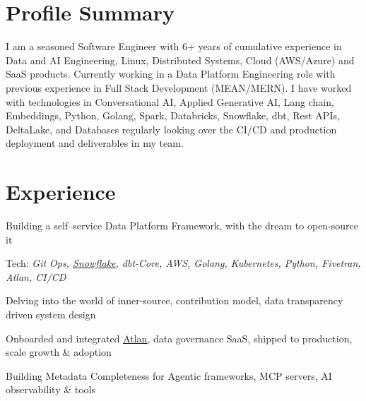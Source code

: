 \documentclass[]{deedy-resume-reversed}
\begin{document}
%
%
\lastupdated

%
%


\section{Profile Summary}
\justifying
I am a seasoned Software Engineer with 6+ years of cumulative experience in Data and AI Engineering, Linux, Distributed Systems, Cloud (AWS/Azure) and SaaS products. Currently working in a Data Platform Engineering role with previous experience in Full Stack Development (MEAN/MERN). I have worked with technologies in Conversational AI, Applied Generative AI, Lang chain, Embeddings, Python, Golang, Spark, Databricks, Snowflake, dbt, Rest APIs, DeltaLake, and Databases regularly looking over the CI/CD and production deployment and deliverables in my team.


\section{Experience}
\vspace{\topsep} %
\begin{tightemize}
\item Building a self–service Data Platform Framework, with the dream to open-source it
\item Tech: \textit{Git Ops, \href{https://www.snowflake.com/en/}{\underline{Snowflake}}, dbt-Core, AWS, Golang, Kubernetes, Python, Fivetran, Atlan, CI/CD}
\item Delving into the world of inner-source, contribution model, data transparency driven system design
\item Onboarded and integrated \href{https://atlan.com/demo/?ref=%2F&tour=data-discovery}{{\underline{Atlan}}}, data governance SaaS, shipped to production, scale growth \& adoption
\item Building Metadata Completeness for Agentic frameworks, MCP servers, AI observability \& tools
\end{tightemize}
\sectionsep
\end{document}
